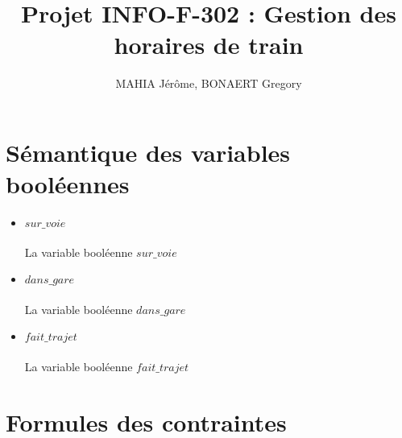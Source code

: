 \documentclass[a4paper]{article}
\title{Projet INFO-F-302 : Gestion des horaires de train}
\author{MAHIA Jérôme, BONAERT Gregory}
\begin{document}
\maketitle

\section{Sémantique des variables booléennes}

\begin{itemize}
\item $sur\_voie$ 
\\
\\
La variable booléenne $sur\_voie$
\item $dans\_gare$
\\
\\
La variable booléenne $dans\_gare$
\item $fait\_trajet$
\\
\\
La variable booléenne $fait\_trajet$
\end{itemize}


\section{Formules des contraintes}
\end{document}
